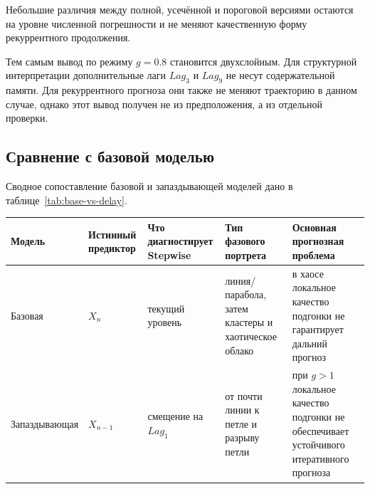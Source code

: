 Небольшие различия между полной, усечённой и пороговой версиями остаются на уровне численной погрешности и не меняют качественную форму рекуррентного продолжения.

Тем самым вывод по режиму \(g=0.8\) становится двухслойным. Для структурной интерпретации дополнительные лаги \(Lag_3\) и \(Lag_9\) не несут содержательной памяти. Для рекуррентного прогноза они также не меняют траекторию в данном случае, однако этот вывод получен не из предположения, а из отдельной проверки.

\subsection{Сравнение с базовой моделью}
\label{sec:sravnenie-s-bazovoi-modelyu}

Сводное сопоставление базовой и запаздывающей моделей дано в таблице~\ref{tab:base-vs-delay}.

\begin{center}
\label{tab:base-vs-delay}
\end{center}

{\def\LTcaptype{none} %
\begin{longtable}[]{@{}
  >{\raggedright\arraybackslash}p{}
  >{\raggedright\arraybackslash}p{}
  >{\raggedright\arraybackslash}p{}
  >{\raggedright\arraybackslash}p{}
  >{\raggedright\arraybackslash}p{}@{}}
\toprule\noalign{}
\begin{minipage}[b]{\linewidth}\raggedright
Модель
\end{minipage} & \begin{minipage}[b]{\linewidth}\raggedright
Истинный предиктор
\end{minipage} & \begin{minipage}[b]{\linewidth}\raggedright
Что диагностирует Stepwise
\end{minipage} & \begin{minipage}[b]{\linewidth}\raggedright
Тип фазового портрета
\end{minipage} & \begin{minipage}[b]{\linewidth}\raggedright
Основная прогнозная проблема
\end{minipage} \\
\midrule\noalign{}
\endhead
\bottomrule\noalign{}
\endlastfoot
Базовая & \(X_n\) & текущий уровень & линия/парабола, затем кластеры и хаотическое облако & в хаосе локальное качество подгонки не гарантирует дальний прогноз \\
Запаздывающая & \(X_{n-1}\) & смещение на \(Lag_1\) & от почти линии к петле и разрыву петли & при \(g>1\) локальное качество подгонки не обеспечивает устойчивого итеративного прогноза \\
\end{longtable}
}

